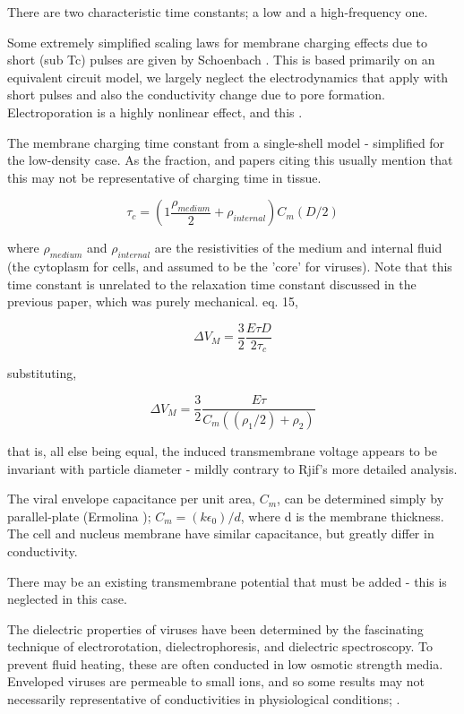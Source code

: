 \documentclass[fleqn,10pt]{paper}
\begin{document}
There are two characteristic time constants; a low and a high-frequency one.

Some extremely simplified scaling laws for membrane charging effects due to short (sub Tc) pulses are given by Schoenbach \cite{Bioelectric2007}. This is based primarily on an equivalent circuit model, we largely neglect the electrodynamics that apply with short pulses and also the conductivity change due to pore formation. Electroporation is a highly nonlinear effect\cite{Letter1974}, and this .

The membrane charging time constant from a single-shell model \cite{Ultrashort2004} - simplified for the low-density case. As the fraction, and papers citing this usually mention that this may not be representative of charging time in tissue.

$$\tau_c = \left(1 \frac{\rho_{medium}}{2} + \rho_{internal}\right) C_m (D/2)$$

where $\rho_{medium}$ and $\rho_{internal}$ are the resistivities of the medium and internal fluid (the cytoplasm for cells, and assumed to be the 'core' for viruses). Note that this time constant is unrelated to the relaxation time constant discussed in the previous paper, which was purely mechanical. \cite{Bioelectric2007} eq. 15, 

$$\Delta V_M = \frac{3}{2}\frac{E\tau D}{2 \tau_c }$$

substituting,

$$\Delta V_M = \frac{3}{2}\frac{E \tau}{C_m ((\rho_1/2) + \rho_2)}$$

that is, all else being equal, the induced transmembrane voltage appears to be invariant with particle diameter - mildly contrary to Rjif's more detailed analysis.

The viral envelope capacitance per unit area, $C_m$, can be determined simply by parallel-plate (Ermolina \cite{Study2001}); $C_m = (k\epsilon_0) / d$, where d is the membrane thickness. The cell and nucleus membrane have similar capacitance, but greatly differ in conductivity. 

There may be an existing transmembrane potential that must be added - this is neglected in this case.

The dielectric properties of viruses have been determined by the fascinating technique of electrorotation, dielectrophoresis, and dielectric spectroscopy. To prevent fluid heating, these are often conducted in low osmotic strength media. Enveloped viruses are permeable to small ions, and so some results may not necessarily representative of conductivities in physiological conditions; \cite{Assessment}.
\end{document}
